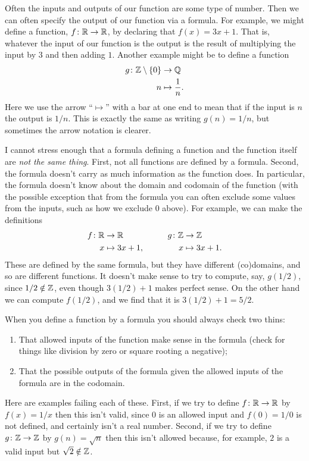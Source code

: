 \documentclass[fleqn]{LectureClass/LectureClass}
\begin{document}
    Often the inputs and outputs of our function are some type of number.
    Then we can often specify the output of our function via a formula.
    For example, we might define a function, \(f \colon \mathbb{R} \to \mathbb{R}\), by declaring that \(f(x) = 3x + 1\).
    That is, whatever the input of our function is the output is the result of multiplying the input by \(3\) and then adding \(1\).
    Another example might be to define a function
    \begin{align}
        g \colon \mathbb{Z} \setminus \{0\} &\to \mathbb{Q}\\
        n &\mapsto \frac{1}{n}.
    \end{align}
    Here we use the arrow \enquote{\(\mapsto\)} with a bar at one end to mean that if the input is \(n\) the output is \(1/n\).
    This is exactly the same as writing \(g(n) = 1/n\), but sometimes the arrow notation is clearer.
    
    I cannot stress enough that a formula defining a function and the function itself are \emph{not the same thing}.
    First, not all functions are defined by a formula.
    Second, the formula doesn't carry as much information as the function does.
    In particular, the formula doesn't know about the domain and codomain of the function (with the possible exception that from the formula you can often exclude some values from the inputs, such as how we exclude \(0\) above).
    For example, we can make the definitions
    \begin{alignat}{3}
        f \colon \mathbb{R} &\to \mathbb{R} &\qquad g \colon \mathbb{Z} &\to \mathbb{Z}\\
        x &\mapsto 3x + 1, & x &\mapsto 3x + 1.
    \end{alignat}
    These are defined by the same formula, but they have different (co)domains, and so are different functions.
    It doesn't make sense to try to compute, say, \(g(1/2)\), since \(1/2 \notin \mathbb{Z}\), even though \(3(1/2) + 1\) makes perfect sense.
    On the other hand we can compute \(f(1/2)\), and we find that it is \(3(1/2) + 1 = 5/2\).
    
    When you define a function by a formula you should always check two thins:
    \begin{enumerate}
        \item That allowed inputs of the function make sense in the formula (check for things like division by zero or square rooting a negative);
        \item That the possible outputs of the formula given the allowed inputs of the formula are in the codomain.
    \end{enumerate}
    Here are examples failing each of these.
    First, if we try to define \(f \colon \mathbb{R} \to \mathbb{R}\) by \(f(x) = 1/x\) then this isn't valid, since \(0\) is an allowed input and \(f(0) = 1/0\) is not defined, and certainly isn't a real number.
    Second, if we try to define \(g \colon \mathbb{Z} \to \mathbb{Z}\) by \(g(n) = \sqrt{n}\) then this isn't allowed because, for example, \(2\) is a valid input but \(\sqrt{2} \notin \mathbb{Z}\).
    
\end{document}
